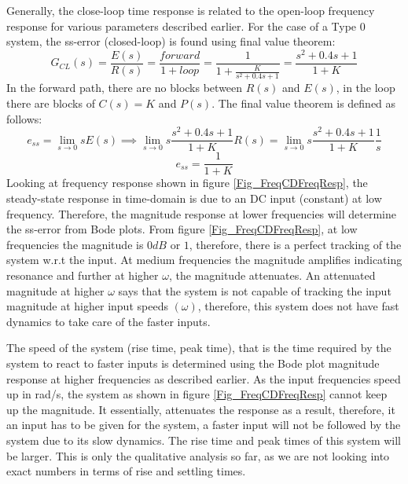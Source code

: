 \newpage
Generally, the close-loop time response is related to the open-loop frequency response for various parameters described earlier. For the case of a Type 0 system, the ss-error (closed-loop) is found using final value theorem:
\begin{equation}
	G_{CL}(s) = \frac{E(s)}{R(s)} = \frac{forward}{1 + loop} =  \frac{1}{1 + \frac{K}{s^2 + 0.4s + 1}} = \frac{s^2 + 0.4s + 1}{1 + K}
\end{equation}
In the forward path, there are no blocks between $R(s)$ and $E(s)$, in the loop there are blocks of $C(s) = K$ and $P(s)$.
The final value theorem is defined as follows:
\begin{equation}
	e_{ss} = \lim_{s\to 0} s E(s) \implies \lim_{s\to 0} s  \frac{s^2 + 0.4s + 1}{1 + K} R(s) = \lim_{s\to 0} s  \frac{s^2 + 0.4s + 1}{1 + K} \frac{1}{s}
\end{equation}
\begin{equation}
	e_{ss} = \frac{1}{1 + K}
\end{equation}
Looking at frequency response shown in figure \ref{Fig_FreqCDFreqResp}, the steady-state response in time-domain is due to an DC input (constant) at low frequency. Therefore, the magnitude response at lower frequencies will determine the ss-error from Bode plots. From figure \ref{Fig_FreqCDFreqResp}, at low frequencies the magnitude is $0 dB$ or $1$, therefore, there is a perfect tracking of the system w.r.t the input. At medium frequencies the magnitude amplifies indicating resonance and further at higher $\omega$, the magnitude attenuates. An attenuated magnitude at higher $\omega$ says that the system is not capable of tracking the input magnitude at higher input speeds $(\omega)$, therefore, this system does not have fast dynamics to take care of the faster inputs.

The speed of the system (rise time, peak time), that is the time required by the system to react to faster inputs is determined using the Bode plot magnitude response at higher frequencies as described earlier. As the input frequencies speed up in rad/s, the system as shown in figure \ref{Fig_FreqCDFreqResp} cannot keep up the magnitude. It essentially, attenuates the response as a result, therefore, it an input has to be given for the system, a faster input will not be followed by the system due to its slow dynamics. The rise time and peak times of this system will be larger. This is only the qualitative analysis so far, as we are not looking into exact numbers in terms of rise and settling times.

